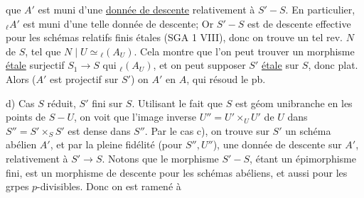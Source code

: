 que $A'$ est muni d'une \uline{donnée de descente} relativement à $S'\mathbin{-}S$. En particulier, \deleted{$\unsure{\ell}$} ${}_\ell A'$ est muni d'une telle donnée de descente;   Or $S'\mathbin{-}S$ est  de descente effective pour les schémas relatifs finis étales (SGA 1 VIII), donc on trouve un  tel rev.   $N$ de $S$, tel que $N\mid U\simeq{}_{\ell}(A_U)$. Cela montre que l'on peut trouver un morphisme  \uline{étale} surjectif $S_1\to S$ qui  ${}_\ell(A_U)$,  et on peut supposer $S'$  \uline{étale} sur $S$, donc plat. Alors ($A'$ est projectif sur $S'$) on   $A'$ en $A$, qui résoud le pb.

d) Cas $S$ réduit, \unsure{(}$S'$ fini sur $S$. Utilisant le fait que $S$ est géom unibranche en les points de $S-U$, on voit que l'image inverse $U''=U'\times_U U'$ de $U$ dans $S''=S'\times_S S'$ est dense dans $S''$.
Par le cas c), on trouve sur $S'$ un schéma abélien $A'$, et par la pleine fidélité (pour $S'',U''$), une donnée de descente sur $A'$, relativement à $S'\to S$. Notons que le morphisme $S'\mathbin{-}S$, étant un épimorphisme fini, est un morphisme de descente pour les schémas abéliens,  et aussi pour les grpes $p$-divisibles. Donc on est ramené à
